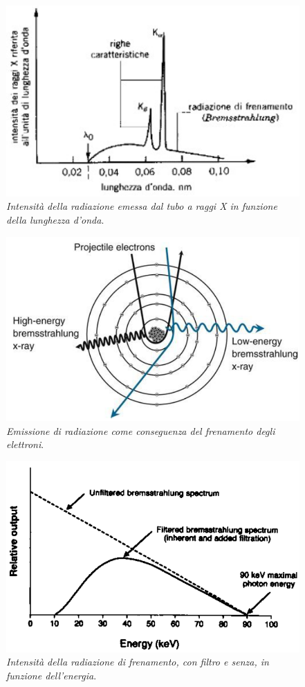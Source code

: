 \documentclass{report}
\numberwithin{equation}{section}
\numberwithin{figure}{section}
\begin{document}
\begin{figure}[htp]
\centering
\includegraphics[scale=1.2]{immagini/spettrox.png}
\caption{\label{fig:spettrox} \textit{Intensità della radiazione emessa dal tubo a raggi X in funzione della lunghezza d'onda}.}
\end{figure}

\begin{figure}[htp]
\centering
\includegraphics[scale=0.6]{immagini/dece.png}
\caption{\label{fig:dece} \textit{Emissione di radiazione come conseguenza del frenamento degli elettroni}.}
\end{figure}

\begin{figure}[htp]
\centering
\includegraphics[scale=0.7]{immagini/filtro.png}
\caption{\label{fig:filtro} \textit{Intensità della radiazione di frenamento, con filtro e senza, in funzione dell'energia}.}
\end{figure}
\end{document}
